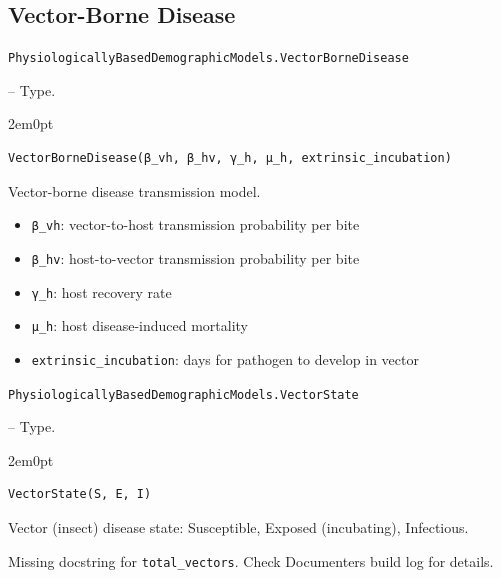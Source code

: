\subsection{Vector-Borne Disease}



\label{7446181516523521487}{}

\hypertarget{5406202159030240209}{\texttt{PhysiologicallyBasedDemographicModels.VectorBorneDisease}}  -- {Type.}

\begin{adjustwidth}{2em}{0pt}


\begin{verbatim}
VectorBorneDisease(β_vh, β_hv, γ_h, μ_h, extrinsic_incubation)
\end{verbatim}

Vector-borne disease transmission model.

\begin{itemize}
\item \texttt{β\_vh}: vector-to-host transmission probability per bite


\item \texttt{β\_hv}: host-to-vector transmission probability per bite


\item \texttt{γ\_h}: host recovery rate


\item \texttt{μ\_h}: host disease-induced mortality


\item \texttt{extrinsic\_incubation}: days for pathogen to develop in vector

\end{itemize}


\end{adjustwidth}
\hypertarget{11905604250997868573}{\texttt{PhysiologicallyBasedDemographicModels.VectorState}}  -- {Type.}

\begin{adjustwidth}{2em}{0pt}


\begin{verbatim}
VectorState(S, E, I)
\end{verbatim}

Vector (insect) disease state: Susceptible, Exposed (incubating), Infectious.



\end{adjustwidth}

\begin{tcolorbox}[toptitle=-1mm,bottomtitle=1mm,colback=admonition-warning!50!white,colframe=admonition-warning,title=\textbf{Missing docstring.}]
Missing docstring for \texttt{total\_vectors}. Check Documenter{\textquotesingle}s build log for details.

\end{tcolorbox}

